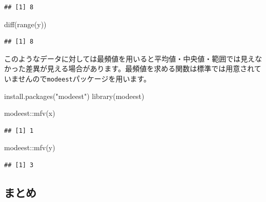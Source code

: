 \documentclass[
  12pt,
]{book}
\newenvironment{Shaded}{\begin{snugshade}}{\end{snugshade}}
\newcommand{\FunctionTok}[1]{\textcolor[rgb]{0.00,0.00,0.00}{#1}}
\newcommand{\NormalTok}[1]{#1}
\newcommand{\SpecialCharTok}[1]{\textcolor[rgb]{0.00,0.00,0.00}{#1}}
\newcommand{\StringTok}[1]{\textcolor[rgb]{0.31,0.60,0.02}{#1}}
\begin{document}
\begin{verbatim}
## [1] 8
\end{verbatim}

\begin{Shaded}
\begin{Highlighting}[numbers=left,,]
\FunctionTok{diff}\NormalTok{(}\FunctionTok{range}\NormalTok{(y))}
\end{Highlighting}
\end{Shaded}

\begin{verbatim}
## [1] 8
\end{verbatim}

このようなデータに対しては最頻値を用いると平均値・中央値・範囲では見えなかった差異が見える場合があります。最頻値を求める関数は標準では用意されていませんので\texttt{modeest}パッケージを用います。

\begin{Shaded}
\begin{Highlighting}[numbers=left,,]
\FunctionTok{install.packages}\NormalTok{(}\StringTok{"modeest"}\NormalTok{)}
\FunctionTok{library}\NormalTok{(modeest)}
\end{Highlighting}
\end{Shaded}

\begin{Shaded}
\begin{Highlighting}[numbers=left,,]
\NormalTok{modeest}\SpecialCharTok{::}\FunctionTok{mfv}\NormalTok{(x)}
\end{Highlighting}
\end{Shaded}

\begin{verbatim}
## [1] 1
\end{verbatim}

\begin{Shaded}
\begin{Highlighting}[numbers=left,,]
\NormalTok{modeest}\SpecialCharTok{::}\FunctionTok{mfv}\NormalTok{(y)}
\end{Highlighting}
\end{Shaded}

\begin{verbatim}
## [1] 3
\end{verbatim}

\newpage

\hypertarget{ux307eux3068ux3081-1}{%
\subsection{まとめ}\label{ux307eux3068ux3081-1}}
\end{document}

